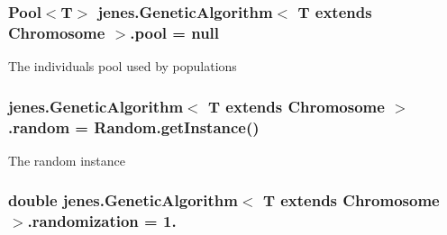 \hypertarget{classjenes_1_1_genetic_algorithm_3_01_t_01extends_01_chromosome_01_4_a355d3311ff5b27ae057c3dd06c75e7cd}{
\subsubsection[{pool}]{\setlength{\rightskip}{0pt plus 5cm}Pool$<$T$>$ jenes.\-Genetic\-Algorithm$<$ T extends Chromosome $>$.pool = null\hspace{0.3cm}{\ttfamily [private]}}}\label{classjenes_1_1_genetic_algorithm_3_01_t_01extends_01_chromosome_01_4_a355d3311ff5b27ae057c3dd06c75e7cd}
The individuals pool used by populations \hypertarget{classjenes_1_1_genetic_algorithm_3_01_t_01extends_01_chromosome_01_4_a1579283e210144ba90b937be0911a028}{
\subsubsection[{random}]{ jenes.\-Genetic\-Algorithm$<$ T extends Chromosome $>$.random = {\bf Random.\-get\-Instance}()\hspace{0.3cm}{\ttfamily [protected]}}}\label{classjenes_1_1_genetic_algorithm_3_01_t_01extends_01_chromosome_01_4_a1579283e210144ba90b937be0911a028}
The random instance \hypertarget{classjenes_1_1_genetic_algorithm_3_01_t_01extends_01_chromosome_01_4_adcb3e16398451c2e318de21d77b51d35}{
\subsubsection[{randomization}]{\setlength{\rightskip}{0pt plus 5cm}double jenes.\-Genetic\-Algorithm$<$ T extends Chromosome $>$.randomization = 1.\hspace{0.3cm}{\ttfamily [protected]}}}\label{classjenes_1_1_genetic_algorithm_3_01_t_01extends_01_chromosome_01_4_adcb3e16398451c2e318de21d77b51d35}
